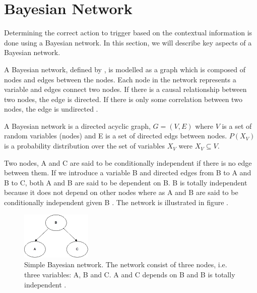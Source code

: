 \section{Bayesian Network}

Determining the correct action to trigger based on the contextual information is done using a Bayesian network. In this section, we will describe key aspects of a Bayesian network.

A Bayesian network, defined by , is modelled as a graph which is composed of nodes and edges between the nodes. Each node in the network represents a variable and edges connect two nodes. If there is a causal relationship between two nodes, the edge is directed. If there is only some correlation between two nodes, the edge is undirected \cite{stephenson2000introduction}.

\begin{definition}
\label{def:bayesian-network}
A Bayesian network is a directed acyclic graph, $G = (V, E)$ where $V$ is a set of random variables (nodes) and E is a set of directed edgs between nodes. $P(X_V)$ is a probability distribution over the set of variables $X_V$ were $X_V \subseteq V$.
\end{definition}

Two nodes, A and C are said to be conditionally independent if there is no edge between them. If we introduce a variable B and directed edges from B to A and B to C, both A and B are said to be dependent on B. B is totally independent because it does not depend on other nodes where as A and B are said to be conditionally independent given B \cite{stephenson2000introduction}. The network is illustrated in figure .

\begin{figure}[h!]
\centering
\includegraphics[width=0.3\textwidth]{images/a_b_c_bayesian_network}
\caption{Simple Bayesian network. The network consist of three nodes, i.e. three variables: A, B and C. A and C depends on B and B is totally independent \cite{stephenson2000introduction}.}
\label{fig:analysis:bayesian-network:abc}
\end{figure}

